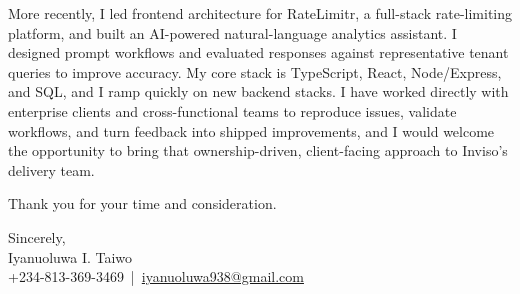 \documentclass[a4paper, 12pt]{article}
\begin{document}
	More recently, I led frontend architecture for RateLimitr, a full-stack
	rate-limiting platform, and built an AI-powered natural-language analytics
	assistant. I designed prompt workflows and evaluated responses against
	representative tenant queries to improve accuracy. My core stack is
	TypeScript, React, Node/Express, and SQL, and I ramp quickly on new backend
	stacks. I have worked directly with enterprise clients and cross-functional
	teams to reproduce issues, validate workflows, and turn feedback into shipped
	improvements, and I would welcome the opportunity to bring that
	ownership-driven, client-facing approach to Inviso's delivery team.

	Thank you for your time and consideration.

	\vspace{10pt}

	\noindent
	Sincerely,\\ Iyanuoluwa I. Taiwo\\ +234-813-369-3469 \,|\, \href{mailto:iyanuoluwa938@gmail.com}{iyanuoluwa938@gmail.com}
\end{document}
